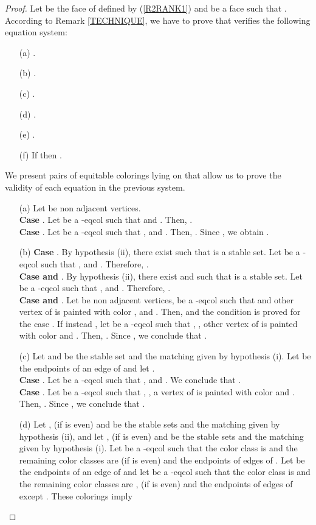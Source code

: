 \begin{proof}
Let  be the face of  defined by (\ref{R2RANK1}) and
 be a face such that .
According to Remark \ref{TECHNIQUE}, we have to prove that  verifies the following equation system: 
\begin{enumerate}
\item[(a)] .
\item[(b)] .
\item[(c)] .
\item[(d)] .
\item[(e)] .
\item[(f)] If  then .
\end{enumerate}
We present pairs of equitable colorings lying on  that allow us to
prove the validity of each equation in the previous system.
\begin{enumerate}
\item[(a)] Let  be non adjacent vertices.\\
\textbf{Case }. Let  be a -eqcol such that  and
. Then, .\\
\textbf{Case }. 
Let  be a -eqcol such that ,  and . Then, 
. Since , we obtain .
\item[(b)] \textbf{Case }. 
By hypothesis (ii), there exist  such that  is a stable set.
Let  be a -eqcol such that ,  and
. Therefore, .\\
\textbf{Case  and }. By hypothesis (ii), there exist  and  such
that   is a stable set. Let  be a -eqcol such that , 
and . Therefore, .\\
\textbf{Case  and }. Let  be non adjacent vertices,
 be a -eqcol such that  and other vertex
of  is painted with color , and .
Then,  and the condition is proved for the case .
If instead , let  be a -eqcol such that , , other vertex of  is
painted with color  and . Then, 
.
Since , we conclude that .
\item[(c)] Let  and  be the stable set and the matching given by hypothesis (i). Let  be
the endpoints of an edge of  and let .\\
\textbf{Case }. Let  be a -eqcol such that ,  and
. We conclude that .\\
\textbf{Case }. Let  be a -eqcol such that , , a vertex of  is
painted with color  and . Then,
.
Since , we conclude that
.
\item[(d)] Let ,  (if  is even) and  be the stable sets and the matching given
by hypothesis (ii), and let ,  (if  is even) and  be the stable sets and the matching given by hypothesis
(i). Let  be a -eqcol such that the color class  is  and the
remaining color classes are  (if  is even) and the endpoints of edges of .
Let  be the endpoints of an edge of  and
let  be a -eqcol such that the color class  is  and the
remaining color classes are ,  (if  is even) and the endpoints of edges of  except
. These colorings imply


\end{enumerate}
\end{proof}
